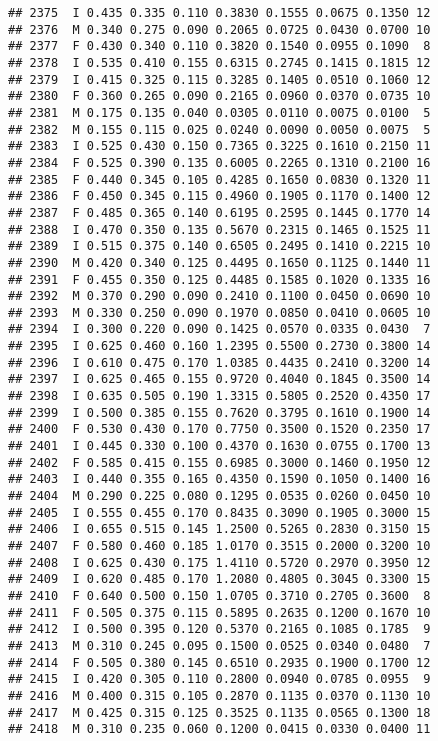 \documentclass[
]{article}
\begin{document}
\begin{verbatim}
## 2375  I 0.435 0.335 0.110 0.3830 0.1555 0.0675 0.1350 12
## 2376  M 0.340 0.275 0.090 0.2065 0.0725 0.0430 0.0700 10
## 2377  F 0.430 0.340 0.110 0.3820 0.1540 0.0955 0.1090  8
## 2378  I 0.535 0.410 0.155 0.6315 0.2745 0.1415 0.1815 12
## 2379  I 0.415 0.325 0.115 0.3285 0.1405 0.0510 0.1060 12
## 2380  F 0.360 0.265 0.090 0.2165 0.0960 0.0370 0.0735 10
## 2381  M 0.175 0.135 0.040 0.0305 0.0110 0.0075 0.0100  5
## 2382  M 0.155 0.115 0.025 0.0240 0.0090 0.0050 0.0075  5
## 2383  I 0.525 0.430 0.150 0.7365 0.3225 0.1610 0.2150 11
## 2384  F 0.525 0.390 0.135 0.6005 0.2265 0.1310 0.2100 16
## 2385  F 0.440 0.345 0.105 0.4285 0.1650 0.0830 0.1320 11
## 2386  F 0.450 0.345 0.115 0.4960 0.1905 0.1170 0.1400 12
## 2387  F 0.485 0.365 0.140 0.6195 0.2595 0.1445 0.1770 14
## 2388  I 0.470 0.350 0.135 0.5670 0.2315 0.1465 0.1525 11
## 2389  I 0.515 0.375 0.140 0.6505 0.2495 0.1410 0.2215 10
## 2390  M 0.420 0.340 0.125 0.4495 0.1650 0.1125 0.1440 11
## 2391  F 0.455 0.350 0.125 0.4485 0.1585 0.1020 0.1335 16
## 2392  M 0.370 0.290 0.090 0.2410 0.1100 0.0450 0.0690 10
## 2393  M 0.330 0.250 0.090 0.1970 0.0850 0.0410 0.0605 10
## 2394  I 0.300 0.220 0.090 0.1425 0.0570 0.0335 0.0430  7
## 2395  I 0.625 0.460 0.160 1.2395 0.5500 0.2730 0.3800 14
## 2396  I 0.610 0.475 0.170 1.0385 0.4435 0.2410 0.3200 14
## 2397  I 0.625 0.465 0.155 0.9720 0.4040 0.1845 0.3500 14
## 2398  I 0.635 0.505 0.190 1.3315 0.5805 0.2520 0.4350 17
## 2399  I 0.500 0.385 0.155 0.7620 0.3795 0.1610 0.1900 14
## 2400  F 0.530 0.430 0.170 0.7750 0.3500 0.1520 0.2350 17
## 2401  I 0.445 0.330 0.100 0.4370 0.1630 0.0755 0.1700 13
## 2402  F 0.585 0.415 0.155 0.6985 0.3000 0.1460 0.1950 12
## 2403  I 0.440 0.355 0.165 0.4350 0.1590 0.1050 0.1400 16
## 2404  M 0.290 0.225 0.080 0.1295 0.0535 0.0260 0.0450 10
## 2405  I 0.555 0.455 0.170 0.8435 0.3090 0.1905 0.3000 15
## 2406  I 0.655 0.515 0.145 1.2500 0.5265 0.2830 0.3150 15
## 2407  F 0.580 0.460 0.185 1.0170 0.3515 0.2000 0.3200 10
## 2408  I 0.625 0.430 0.175 1.4110 0.5720 0.2970 0.3950 12
## 2409  I 0.620 0.485 0.170 1.2080 0.4805 0.3045 0.3300 15
## 2410  F 0.640 0.500 0.150 1.0705 0.3710 0.2705 0.3600  8
## 2411  F 0.505 0.375 0.115 0.5895 0.2635 0.1200 0.1670 10
## 2412  I 0.500 0.395 0.120 0.5370 0.2165 0.1085 0.1785  9
## 2413  M 0.310 0.245 0.095 0.1500 0.0525 0.0340 0.0480  7
## 2414  F 0.505 0.380 0.145 0.6510 0.2935 0.1900 0.1700 12
## 2415  I 0.420 0.305 0.110 0.2800 0.0940 0.0785 0.0955  9
## 2416  M 0.400 0.315 0.105 0.2870 0.1135 0.0370 0.1130 10
## 2417  M 0.425 0.315 0.125 0.3525 0.1135 0.0565 0.1300 18
## 2418  M 0.310 0.235 0.060 0.1200 0.0415 0.0330 0.0400 11

\end{verbatim}
\end{document}

